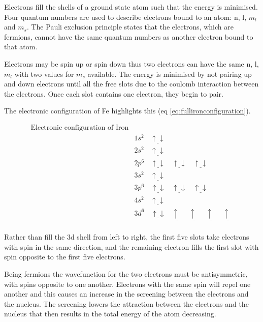 Electrons fill the shells of a ground state atom such that the energy is minimised.  Four quantum numbers are used to describe electrons bound to an atom: n, l, $m_l$ and $m_s$.  The Pauli exclusion principle states that the electrons, which are fermions, cannot have the same quantum numbers as another electron bound to that atom.

Electrons may be spin up or spin down thus two electrons can have the same n, l, $m_l$ with two values for $m_s$ available.  The energy is minimised by not pairing up and down electrons until all the free slots due to the coulomb interaction between the electrons.  Once each slot contains one electron, they begin to pair.

The electronic configuration of \Gls{Fe} highlights this (eq \ref{eq:fullironconfiguration}).


\begin{equation}
\begin{split}
\text{Electronic configuration of Iron}\\
&1s^2 \:\:\:\: \underline{\uparrow \downarrow} \\
&2s^2 \:\:\:\: \underline{\uparrow \downarrow} \\
&2p^6 \:\:\:\: \underline{\uparrow \downarrow} \:\:\:\:  \underline{\uparrow  \downarrow} \:\:\:\:  \underline{\uparrow  \downarrow} \\
&3s^2 \:\:\:\: \underline{\uparrow \downarrow} \\
&3p^6 \:\:\:\: \underline{\uparrow \downarrow} \:\:\:\:  \underline{\uparrow \downarrow} \:\:\:\:  \underline{\uparrow \downarrow} \\
&4s^2 \:\:\:\: \underline{\uparrow \downarrow} \\
&3d^6 \:\:\:\: \underline{\uparrow \downarrow} \:\:\:\:  \underline{\uparrow \:\:} \:\:\:\:  \underline{\uparrow \:\:} \:\:\:\: \underline{\uparrow \:\:} \:\:\:\: \underline{\uparrow \:\:}\\
\end{split}
\label{eq:fullironconfiguration}
\end{equation}

Rather than fill the 3d shell from left to right, the first five slots take electrons with spin in the same direction, and the remaining electron fills the first slot with spin opposite to the first five electrons.

Being fermions the wavefunction for the two electrons must be antisymmetric, with spins opposite to one another.  Electrons with the same spin will repel one another and this causes an increase in the screening between the electrons and the nucleus.  The screening lowers the attraction between the electrons and the nucleus that then results in the total energy of the atom decreasing\cite{aligningelectrons}.

